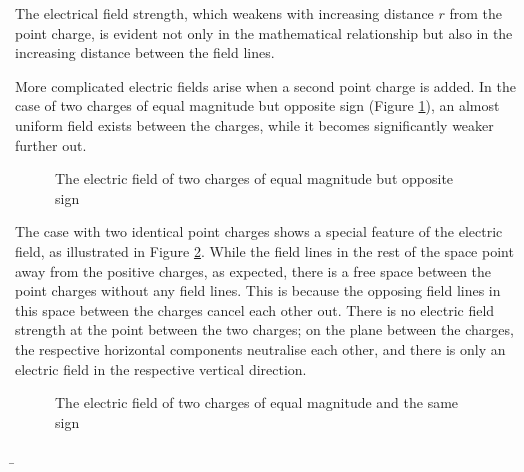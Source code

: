 \begin{frame}
{	The electrical field strength, which weakens with increasing distance $r$ from the point charge,
 	is evident not only in the mathematical relationship but also in the increasing distance between the field lines.


	More complicated electric fields arise when a second point charge is added.
	In the case of two charges of equal magnitude but opposite sign
	(Figure \ref{fig:anziehende_ladungen}), an almost uniform field exists between the charges, 
	while it becomes significantly weaker further out.
 

	\begin{figure}[h!]
		\renewcommand{\figurename}{Figure}
		\centering
		
		\caption{The electric field of two charges of equal magnitude but opposite sign}
		\label{fig:anziehende_ladungen}
	\end{figure}

	The case with two identical point charges shows a special feature of the electric field, as illustrated in Figure \ref{fig:abstoßendeladungen}.
	While the field lines in the rest of the space point away from the positive charges, as expected,
	there is a free space between the point charges without any field lines.
	This is because the opposing field lines in this space between the charges cancel each other out. 
    There is no electric field strength at the point between the two charges; on the plane between the charges,
	the respective horizontal components neutralise each other, and there is only an electric field in the respective 
	vertical direction.

	
	\begin{figure}[h!]
		\renewcommand{\figurename}{Figure}
		\centering
		
		\caption{The electric field of two charges of equal magnitude and the same sign}
		\label{fig:abstoßendeladungen}
	\end{figure}

	\newpage

 	}
	
	\b{


	\begin{columns}
	   \begin{figure}[h!]
		\centering
		
	\end{figure}

	
		
\end{columns}}
\end{frame}
